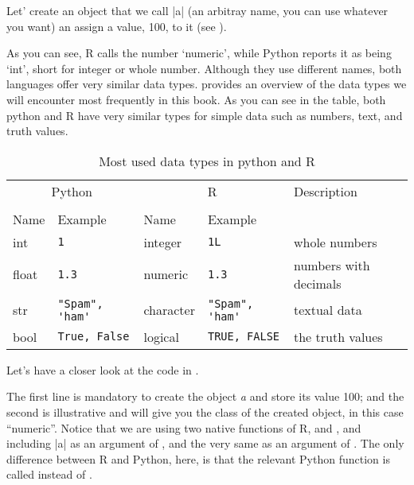 Let' create an object that we call |a| (an arbitray name, you can use
whatever you want) an assign a value, 100, to it (see ).


As you can see, R calls the number `numeric', while Python reports it
as being `int', short for integer or whole number.  Although they use
different names, both languages offer very similar data types.
 provides an overview of the data types we will
encounter most frequently in this book.  As you can see in the table,
both python and R have very similar types for simple data such as
numbers, text, and truth values.

\newcommand{\fndouble}{In R, double and numeric can generally be used
  interchangably (there is a subtle difference, but that is not
  relevant here).}

\begin{table}
  \caption{\label{tab:types}Most used data types in python and R}{
  \begin{tabularx}{\textwidth}{lllll}
    \toprule
    \multicolumn{2}{c}{Python} & \multicolumn{2}{c}{R}& Description \\
    \cmidrule(lr){1-2}    \cmidrule(lr){3-4}\\
    Name & Example & Name & Example \\
    \midrule
    int   & \verb+1+             & integer   & \verb+1L+             & whole numbers \\
    float & \verb+1.3+           & numeric   & \verb+1.3+           & numbers with decimals \\
    str   & \verb+"Spam", 'ham'+ & character & \verb+"Spam", 'ham'+ & textual data  \\ 
    bool  & \verb+True, False+   & logical   & \verb+TRUE, FALSE+   & the truth values \\
    \bottomrule
  \end{tabularx}}{}
\end{table}
    


Let's have a closer look at the code in .

The first line is mandatory to create the object \emph{a} and store
its value 100; and the second is illustrative and will give you the
class of the created object, in this case ``numeric''. Notice that we
are using two native functions of R,  and , and
including |a| as an argument of , and the very same
 as an argument of . The only difference
between R and Python, here, is that the relevant Python function is
called  instead of .

